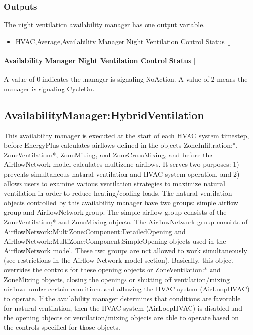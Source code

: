 \subsubsection{Outputs}\label{outputs-8-008}

The night ventilation availability manager has one output variable.

\begin{itemize}
\tightlist
\item
  HVAC,Average,Availability Manager Night Ventilation Control Status {[]}
\end{itemize}

\paragraph{Availability Manager Night Ventilation Control Status {[]}}\label{availability-manager-night-ventilation-control-status}

A value of 0 indicates the manager is signaling NoAction. A value of 2 means the manager is signaling CycleOn.

\subsection{AvailabilityManager:HybridVentilation}\label{availabilitymanagerhybridventilation}

This availability manager is executed at the start of each HVAC system timestep, before EnergyPlus calculates airflows defined in the objects ZoneInfiltration:*, ZoneVentilation:*, ZoneMixing, and ZoneCrossMixing, and before the AirflowNetwork model calculates multizone airflows. It serves two purposes: 1) prevents simultaneous natural ventilation and HVAC system operation, and 2) allows users to examine various ventilation strategies to maximize natural ventilation in order to reduce heating/cooling loads. The natural ventilation objects controlled by this availability manager have two groups: simple airflow group and AirflowNetwork group. The simple airflow group consists of the ZoneVentilation;* and ZoneMixing objects. The AirflowNetwork group consists of AirflowNetwork:MultiZone:Component:DetailedOpening and AirflowNetwork:MultiZone:Component:SimpleOpening objects used in the AirflowNetwork model. These two groups are not allowed to work simultaneously (see restrictions in the Airflow Network model section). Basically, this object overrides the controls for these opening objects or ZoneVentilation:* and ZoneMixing objects, closing the openings or shutting off ventilation/mixing airflows under certain conditions and allowing the HVAC system (AirLoopHVAC) to operate. If the availability manager determines that conditions are favorable for natural ventilation, then the HVAC system (AirLoopHVAC) is disabled and the opening objects or ventilation/mixing objects are able to operate based on the controls specified for those objects.

